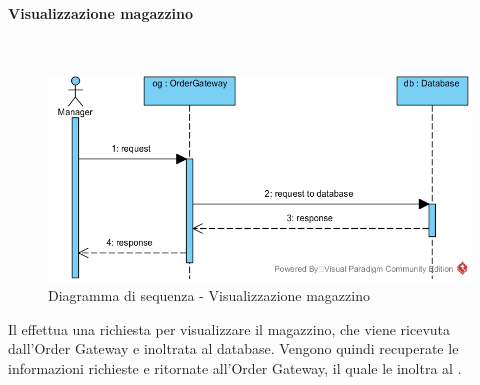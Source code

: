 \begin{samepage}
\paragraph{Visualizzazione magazzino}\mbox{}\\
\end{samepage}
\begin{figure}[H]
	\centering
	\includegraphics[width=15cm]{../../documenti/SpecificaTecnica/diagrammi/sequenza/direttore_visualizza_magazzino.png}
	\caption{Diagramma di sequenza - Visualizzazione magazzino}
\end{figure}
Il \Manager{} effettua una richiesta per visualizzare il magazzino, che viene ricevuta dall'Order Gateway e inoltrata al database. Vengono quindi recuperate le informazioni richieste e ritornate all'Order Gateway, il quale le inoltra al \Manager{}.

